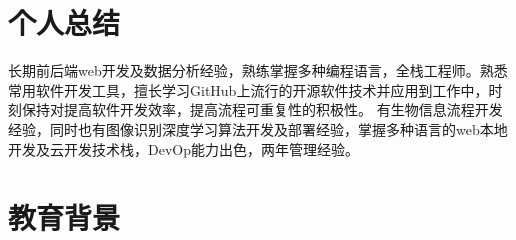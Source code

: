 \documentclass{resume}
\begin{document}


 
\section{个人总结}
长期前后端web开发及数据分析经验，熟练掌握多种编程语言，全栈工程师。熟悉常用软件开发工具，擅长学习GitHub上流行的开源软件技术并应用到工作中，时刻保持对提高软件开发效率，提高流程可重复性的积极性。
有生物信息流程开发经验，同时也有图像识别深度学习算法开发及部署经验，掌握多种语言的web本地开发及云开发技术栈，DevOp能力出色，两年管理经验。

\section{教育背景}

\end{document}
